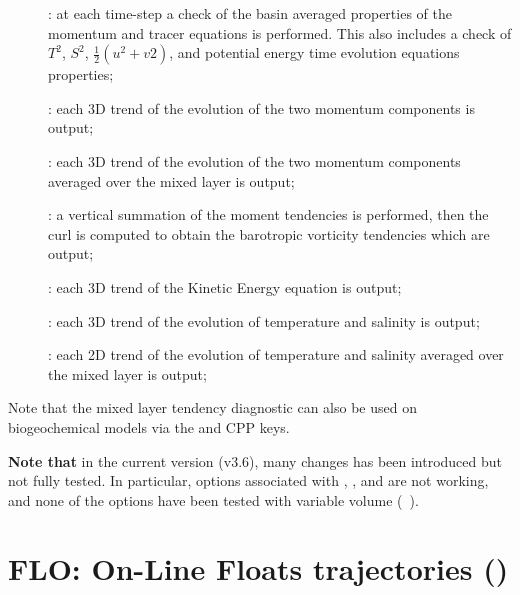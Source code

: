 \documentclass[../main/NEMO_manual]{subfiles}
\begin{document}
\begin{description}
\item [{}]: at each  time-step a check of the basin averaged properties of
  the momentum and tracer equations is performed.
  This also includes a check of $T^2$, $S^2$, $\tfrac{1}{2} (u^2+v2)$,
  and potential energy time evolution equations properties;
\item [{}]: each 3D trend of the evolution of the two momentum components is output;
\item [{}]: each 3D trend of the evolution of the two momentum components averaged over the mixed layer is output;
\item [{}]: a vertical summation of the moment tendencies is performed,
  then the curl is computed to obtain the barotropic vorticity tendencies which are output;
\item [{}]  : each 3D trend of the Kinetic Energy equation is output;
\item [{}]: each 3D trend of the evolution of temperature and salinity is output;
\item [{}]: each 2D trend of the evolution of temperature and salinity averaged over the mixed layer is output;
\end{description}

Note that the mixed layer tendency diagnostic can also be used on biogeochemical models via
the  and  CPP keys.

\textbf{Note that} in the current version (v3.6), many changes has been introduced but not fully tested.
In particular, options associated with , , and  are not working,
and none of the options have been tested with variable volume (\ie\ ).

\section[FLO: On-Line Floats trajectories (\texttt{\textbf{key\_floats}})]{FLO: On-Line Floats trajectories (\protect{})}
\label{sec:DIA_FLO}

\begin{listing}
  \caption{}
  \label{lst:namflo}
\end{listing}
\end{document}
